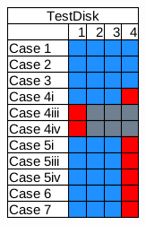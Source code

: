 \begin{figure}[h]
\begin{subfigure}{0.17\linewidth}
        \includegraphics[width=\linewidth]{fig/testdisk_results_ntfs.png}
    \end{subfigure}~~
    \begin{subfigure}{0.17\linewidth}

\end{subfigure}
\end{figure}
